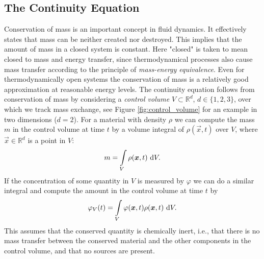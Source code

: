 \subsection{The Continuity Equation}
\label{section:continuity_equation}
Conservation of mass is an important concept in fluid dynamics. It effectively states that mass can be neither created nor destroyed. This implies that the amount of mass in a closed system is constant. Here "closed" is taken to mean closed to mass and energy transfer, since thermodynamical processes also cause mass transfer according to the principle of \emph{mass-energy equivalence}.
Even for thermodynamically open systems the conservation of mass is a relatively good approximation at reasonable energy levels. The continuity equation follows from conservation of mass by considering a \emph{control volume} $V \subset \mathbb{R}^d$, $d \in \{1,2,3\}$, over which we track mass exchange, see Figure \ref{fig:control_volume} for an example in two dimensions ($d = 2$). For a material with density $\rho$ we can compute the mass $m$ in the control volume at time $t$ by a volume integral of $\rho(\vec{x},t)$ over $V$, where $\vec{x} \in \mathbb{R}^d$ is a point in $V$:
\begin{equation*}
m = \int \limits_{V} \rho(\boldsymbol{x},t) \ \text{d}V.
\end{equation*}
If the concentration of some quantity in $V$ is measured by $\varphi$ we can do a similar integral and compute the amount in the control volume at time $t$ by
\begin{equation*}
\varphi_V(t) = \int \limits_{V} \varphi(\boldsymbol{x},t)\rho(\boldsymbol{x},t) \ \text{d}V.
\end{equation*}
This assumes that the conserved quantity is chemically inert, i.e., that there is no mass transfer between the conserved material and the other components in the control volume, and that no sources are present.
